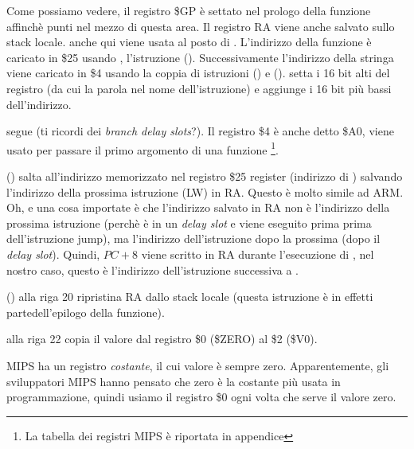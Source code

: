 

Come possiamo vedere, il registro \$GP è settato nel prologo della funzione affinchè punti nel mezzo di questa area.
Il registro \ac{RA} viene anche salvato sullo stack locale.
\puts anche qui viene usata al posto di \printf.
L'indirizzo della funzione \puts è caricato in \$25 usando , l'istruzione ().
Successivamente l'indirizzo della stringa viene caricato in \$4 usando la coppia di istruzioni  () e
 ().
 setta i 16 bit alti del registro (da cui la parola  nel nome dell'istruzione) e  aggiunge
i 16 bit più bassi dell'indirizzo.

 segue  (ti ricordi dei \emph{branch delay slots}?).
Il registro \$4 è anche detto \$A0, viene usato per passare il primo argomento di una funzione
\footnote{La tabella dei registri MIPS è riportata in appendice }.


 () salta all'indirizzo memorizzato nel registro \$25 register (indirizzo di \puts)
salvando l'indirizzo della prossima istruzione (LW) in \ac{RA}.
Questo è molto simile ad ARM.
Oh, e una cosa importate è che l'indirizzo salvato in \ac{RA} non è l'indirizzo della prossima istruzione (perchè è in un
\emph{delay slot} e viene eseguito prima prima dell'istruzione jump),
ma l'indirizzo dell'istruzione dopo la prossima (dopo il \emph{delay slot}).
Quindi, $PC + 8$ viene scritto in \ac{RA} durante l'esecuzione di , nel nostro caso, questo è l'indirizzo dell'istruzione
 successiva a .

 () alla riga 20 ripristina \ac{RA} dallo stack locale (questa istruzione è in effetti partedell'epilogo della funzione).


 alla riga 22 copia il valore dal registro \$0 (\$ZERO) al \$2 (\$V0).
\label{MIPS_zero_register}

MIPS ha un registro \emph{costante}, il cui valore è sempre zero.
Apparentemente, gli sviluppatori MIPS hanno pensato che zero è la costante più usata in programmazione, quindi usiamo il registro \$0
 ogni volta che serve il valore zero.


